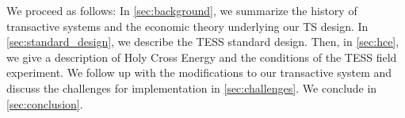 We proceed as follows: In \cref{sec:background}, we summarize the history of transactive systems and the economic theory underlying our TS design. In \cref{sec:standard_design}, we describe the TESS standard design. Then, in \cref{sec:hce}, we give a description of Holy Cross Energy and the conditions of the TESS field experiment. We follow up with the modifications to our transactive system and discuss the challenges for implementation in \cref{sec:challenges}. We conclude in \cref{sec:conclusion}.



